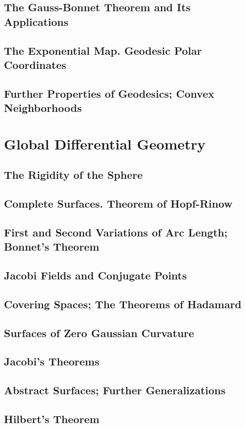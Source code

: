 \documentclass[oneside]{amsbook}
\numberwithin{ex}{section}
\begin{document}
\section{The Gauss-Bonnet Theorem and Its Applications}

\section{The Exponential Map. Geodesic Polar Coordinates}

\section{Further Properties of Geodesics; Convex Neighborhoods}


\chapter{Global Differential Geometry}
\setcounter{section}{1}
\section{The Rigidity of the Sphere}

\section{Complete Surfaces. Theorem of Hopf-Rinow}

\section{First and Second Variations of Arc Length; Bonnet's Theorem}

\section{Jacobi Fields and Conjugate Points}

\section{Covering Spaces; The Theorems of Hadamard}

\setcounter{section}{7}
\section{Surfaces of Zero Gaussian Curvature}

\section{Jacobi's Theorems}

\section{Abstract Surfaces; Further Generalizations}

\section{Hilbert's Theorem}

\end{document}
